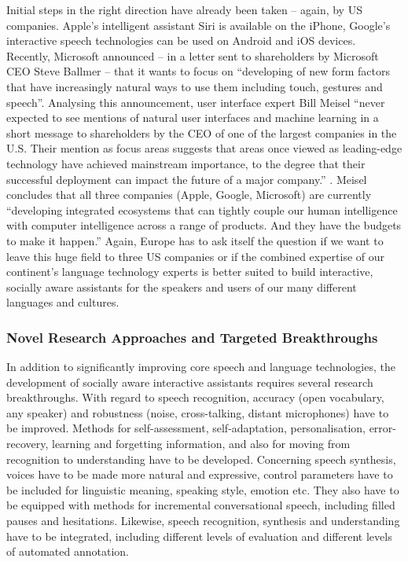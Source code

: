 \documentclass[10pt, plain]{../../metanetpaper}
\begin{document}
\begin{multicols}{2}
Initial steps in the right direction have already been taken -- again, by US companies. Apple's intelligent assistant Siri is available on the iPhone, Google's interactive speech technologies can be used on Android and iOS devices. Recently, Microsoft announced -- in a letter sent to shareholders by Microsoft CEO Steve Ballmer -- that it wants to focus on ``developing of new form factors that have increasingly natural ways to use them including touch, gestures and speech''. Analysing this announcement, user interface expert Bill Meisel ``never expected to see mentions of natural user interfaces and machine learning in a short message to shareholders by the CEO of one of the largest companies in the U.S. Their mention as focus areas suggests that areas once viewed as leading-edge technology have achieved mainstream importance, to the degree that their successful deployment can impact the future of a major company.'' \cite{meisel12}. Meisel concludes that all three companies (Apple, Google, Microsoft) are currently ``developing integrated ecosystems that can tightly couple our human intelligence with computer intelligence across a range of products. And they have the budgets to make it happen.'' Again, Europe has to ask itself the question if we want to leave this huge field to three US companies or if the combined expertise of our continent's language technology experts is better suited to build interactive, socially aware assistants for the speakers and users of our many different languages and cultures.

\subsubsection{Novel Research Approaches and Targeted Breakthroughs}
\label{sec:novel-rese-appr-pt3}

In addition to significantly improving core speech and language technologies, the development of socially aware interactive assistants requires several research breakthroughs. With regard to speech recognition, accuracy (open vocabulary, any speaker) and robustness (noise, cross-talking, distant microphones) have to be improved. Methods for self-assessment, self-adaptation, personalisation, error-recovery, learning and forgetting information, and also for moving from recognition to understanding have to be developed. Concerning speech synthesis, voices have to be made more natural and expressive, control parameters have to be included for linguistic meaning, speaking style, emotion etc. They also have to be equipped with methods for incremental conversational speech, including filled pauses and hesitations. Likewise, speech recognition, synthesis and understanding have to be integrated, including different levels of evaluation and different levels of automated annotation.


\end{multicols}
\end{document}
